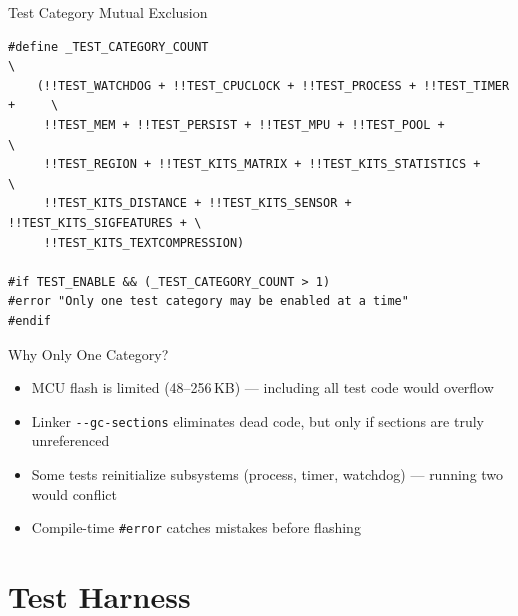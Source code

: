\documentclass[aspectratio=169, 10pt]{beamer}
\begin{document}
\begin{frame}[fragile]{Test Category Mutual Exclusion}
\begin{lstlisting}[style=cstyle, title={tests/tiku\_test\_config.h --- only one category at a time}]
#define _TEST_CATEGORY_COUNT                                                 \
    (!!TEST_WATCHDOG + !!TEST_CPUCLOCK + !!TEST_PROCESS + !!TEST_TIMER +     \
     !!TEST_MEM + !!TEST_PERSIST + !!TEST_MPU + !!TEST_POOL +               \
     !!TEST_REGION + !!TEST_KITS_MATRIX + !!TEST_KITS_STATISTICS +          \
     !!TEST_KITS_DISTANCE + !!TEST_KITS_SENSOR + !!TEST_KITS_SIGFEATURES + \
     !!TEST_KITS_TEXTCOMPRESSION)

#if TEST_ENABLE && (_TEST_CATEGORY_COUNT > 1)
#error "Only one test category may be enabled at a time"
#endif
\end{lstlisting}

\vspace{0.3em}
\begin{block}{Why Only One Category?}
\begin{itemize}
  \item MCU flash is limited (48--256\,KB) --- including all test code would overflow
  \item Linker \texttt{-{}-gc-sections} eliminates dead code, but only if sections are truly unreferenced
  \item Some tests reinitialize subsystems (process, timer, watchdog) --- running two would conflict
  \item Compile-time \texttt{\#error} catches mistakes before flashing
\end{itemize}
\end{block}
\end{frame}

\section{Test Harness}
\end{document}
